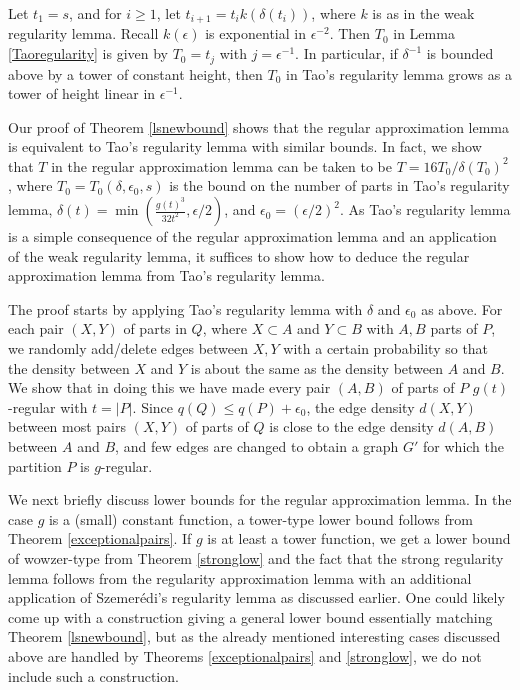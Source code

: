 \documentclass[11pt]{article}
\begin{document}
Let $t_1=s$, and for $i \geq 1$, let $t_{i+1}=t_ik(\delta(t_i))$, where $k$ is
as in the weak regularity lemma. Recall $k(\epsilon)$ is exponential in
$\epsilon^{-2}$. Then $T_0$ in Lemma \ref{Taoregularity} is given by $T_0=t_j$
with $j=\epsilon^{-1}$. In particular, if $\delta^{-1}$ is bounded above by a
tower of constant height, then $T_0$ in Tao's regularity lemma grows as a tower
of height linear in $\epsilon^{-1}$.

Our proof of Theorem \ref{lsnewbound} shows that the regular approximation
lemma is equivalent to Tao's regularity lemma with similar bounds. In
fact, we show that $T$ in the regular approximation lemma can be taken to be
$T=16T_0/\delta(T_0)^2$, where $T_0=T_0(\delta,\epsilon_0,s)$ is the bound on the
number of parts in Tao's regularity lemma,
$\delta(t)=\min(\frac{g(t)^3}{32t^2},\epsilon/2)$, and
$\epsilon_0=(\epsilon/2)^2$. As Tao's regularity lemma is a simple consequence
of the regular approximation lemma and an application of the weak regularity
lemma, it suffices to show how to deduce the regular approximation lemma from
Tao's regularity lemma.

The proof starts by applying Tao's regularity lemma with $\delta$ and
$\epsilon_0$ as above. For each pair $(X,Y)$ of parts in $Q$, where $X \subset
A$ and $Y \subset B$ with $A,B$ parts of $P$, we randomly add/delete edges
between $X,Y$ with a certain probability so that the density between $X$ and
$Y$ is about the same as the density between $A$ and $B$. We show that in
doing this we have made every pair $(A,B)$ of parts of $P$ $g(t)$-regular with $t=|P|$.
Since $q(Q) \leq q(P)+\epsilon_0$, the edge density $d(X,Y)$ between most pairs
$(X,Y)$ of parts of $Q$ is close to the edge density $d(A,B)$ between $A$ and
$B$, and few edges are changed to obtain a graph $G'$ for which the partition
$P$ is $g$-regular.

We next briefly discuss lower bounds for the regular approximation lemma. In
the case $g$ is a (small) constant function, a tower-type lower bound follows
from Theorem \ref{exceptionalpairs}. If $g$ is at least a tower function, we
get a lower bound of wowzer-type from Theorem \ref{stronglow} and the fact that the
strong regularity lemma follows from the regularity approximation lemma with an
additional application of Szemer\'edi's regularity lemma as discussed earlier.
One could likely come up with a construction giving a general lower bound
essentially matching Theorem \ref{lsnewbound}, but as the already mentioned
interesting cases discussed above are handled by Theorems \ref{exceptionalpairs}
and \ref{stronglow}, we do not include such a construction.
\end{document}

